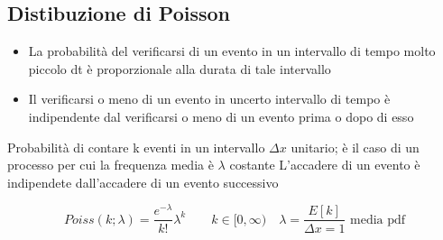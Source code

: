 \documentclass[12pt]{report}
\theoremstyle{remark}
\theoremstyle{theorem}
\begin{document}
\subsection*{Distibuzione di Poisson}
\begin{itemize}
	\item La probabilità del verificarsi di un evento in un intervallo di tempo molto piccolo dt è proporzionale alla durata di tale intervallo 
 \item Il verificarsi o meno di un evento in uncerto intervallo di tempo è indipendente dal verificarsi o meno di un evento prima o dopo di esso 
\end{itemize}
Probabilità di contare k eventi in un intervallo $\Delta x$ unitario; è il caso di un processo per cui la frequenza media è $\lambda$ costante \newline
L'accadere di un evento è indipendete dall'accadere di un evento successivo

\[Poiss(k;\lambda) =  \frac{e^{-\lambda}}{k!}\lambda^k \qquad k\in [0,\infty) \quad \lambda=\frac{E[k]}{\Delta x=1} \text{ media pdf}\]
\end{document}
